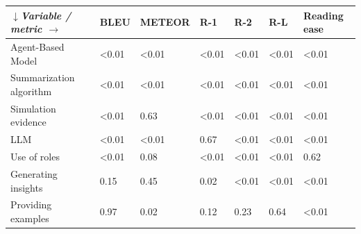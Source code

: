 \begin{tabular}{|l|l|l|l|l|l|l|}
\hline
\textit{$\downarrow$Variable / metric $\rightarrow$} & BLEU & METEOR & R-1 & R-2 & R-L & Reading ease \\
 \hline
 Agent-Based Model & \textless{}0.01 & \textless{}0.01 & \textless{}0.01 & \textless{}0.01 & \textless{}0.01 & \textless{}0.01 \\
 \hline
 Summarization algorithm & \textless{}0.01 & \textless{}0.01 & \textless{}0.01 & \textless{}0.01 & \textless{}0.01 & \textless{}0.01 \\
 \hline
 Simulation evidence & \textless{}0.01 & 0.63 & \textless{}0.01 & \textless{}0.01 & \textless{}0.01 & \textless{}0.01 \\
 \hline
 LLM & \textless{}0.01 & \textless{}0.01 & 0.67 & \textless{}0.01 & \textless{}0.01 & \textless{}0.01 \\
 \hline
 Use of roles & \textless{}0.01 & 0.08 & \textless{}0.01 & \textless{}0.01 & \textless{}0.01 & 0.62 \\
 \hline
 Generating insights & 0.15 & 0.45 & 0.02 & \textless{}0.01 & \textless{}0.01 & \textless{}0.01 \\
 \hline
 Providing examples & 0.97 & 0.02 & 0.12 & 0.23 & 0.64 & \textless{}0.01 \\
\hline
\end{tabular}
